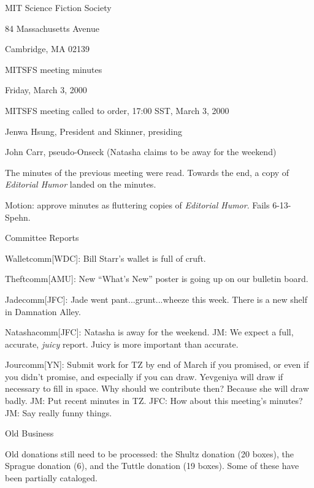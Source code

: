 \documentclass[12pt]{article}
\begin{document}
\begin{center}

MIT Science Fiction Society 

84 Massachusetts Avenue

Cambridge, MA 02139

\vspace{12pt}

MITSFS meeting minutes

Friday, March 3, 2000

\end{center}

\vskip 12pt

MITSFS meeting called to order, 17:00 SST, March 3, 2000

Jenwa Hsung, President and Skinner, presiding

John Carr, pseudo-Onseck (Natasha claims to be away for the weekend)

\vskip 12pt

The minutes of the previous meeting were read.  Towards the end, a
copy of {\it Editorial Humor} landed on the minutes.

Motion: approve minutes as fluttering copies of {\it Editorial Humor}.
Fails \hbox{6-13-Spehn}.

\vskip 12pt

\centerline{Committee Reports}

Walletcomm[WDC]: Bill Starr's wallet is full of cruft.

Theftcomm[AMU]: New ``What's New'' poster is going up on our bulletin board.

Jadecomm[JFC]: Jade went pant...grunt...wheeze this week.  There is a new
shelf in Damnation Alley.

Natashacomm[JFC]: Natasha is away for the weekend.
JM: We expect a full, accurate, {\it juicy} report.  Juicy is more
important than accurate.

Jourcomm[YN]: Submit work for TZ by end of March if you promised, or even
if you didn't promise, and especially if you can draw.  Yevgeniya will draw
if necessary to fill in space.  Why should we contribute then?  Because she
will draw badly.
JM: Put recent minutes in TZ.
JFC: How about this meeting's minutes?
JM: Say really funny things.


\vskip 12pt

\centerline{Old Business}

\vskip 12pt

Old donations still need to be processed: the Shultz donation (20 boxes),
the Sprague donation (6), and the Tuttle donation (19 boxes).  Some of these
have been partially cataloged.
\end{document}
